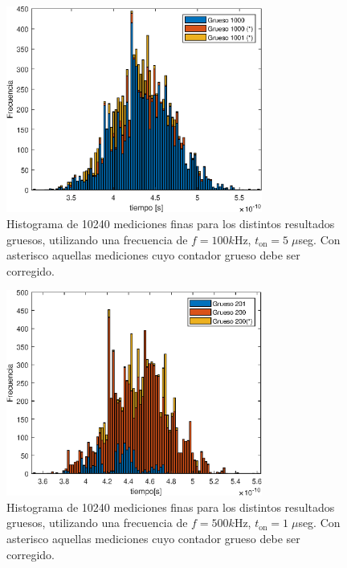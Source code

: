 \begin{figure}[H]
     \centering
     \includegraphics[width=0.75\textwidth]{imagenes/histograma_100k.eps}
     \caption{Histograma de 10240 mediciones finas para los distintos resultados gruesos, 
      utilizando una frecuencia de $f=100k$Hz, $t_{\text{on}}=5 \; \mu$seg. 
      Con asterisco aquellas mediciones cuyo contador grueso debe ser corregido.}
     \label{fig: histograma_100}
\end{figure}

\begin{figure}[H]
     \centering
     \includegraphics[width=0.75\textwidth]{imagenes/histograma_500k.eps}
     \caption{Histograma de 10240 mediciones finas para los distintos resultados gruesos, 
      utilizando una frecuencia de $f=500k$Hz, $t_{\text{on}}=1 \; \mu$seg. 
      Con asterisco aquellas mediciones cuyo contador grueso debe ser corregido.}
     \label{fig: histograma_500}
\end{figure}

